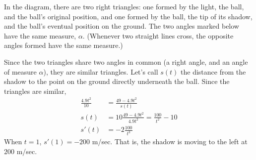 \begin{solution}
In the diagram, there are two right triangles: one formed by the light, the ball, and the ball's original position, and one formed by the ball, the tip of its shadow, and the ball's eventual position on the ground. The two angles marked below have the same measure, $\alpha$. (Whenever two straight lines cross, the opposite angles formed have the same measure.)

\begin{center}
\end{center}

Since the two triangles share two angles in common (a right angle, and an angle of measure $\alpha$), they are similar triangles.
Let's call $s(t)$ the distance from the shadow to the point
on the ground directly underneath the ball. Since the triangles are similar,
\begin{align*}
\frac{4.9 t^2}{10}&=\frac{49-4.9 t^2}{s(t)}\\
 s(t)&=10\frac{49-4.9 t^2}{4.9 t^2}=\frac{100}{t^2}-10\\
 s'(t)&=-2\frac{100}{t^3}
\end{align*}
When $t=1$, $s'(1)=-200$ m/sec. That is, {the shadow is moving to the
left at $200$ m/sec.}
\end{solution}

